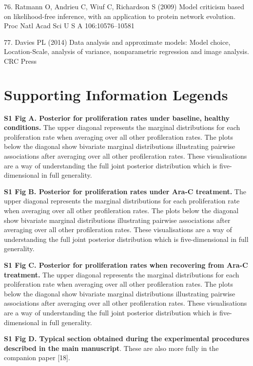 \documentclass[10pt,letterpaper]{article}
\begin{document}
\hypertarget{ref-Ratmann2009-de}{}
76. Ratmann O, Andrieu C, Wiuf C, Richardson S (2009) Model criticism
based on likelihood-free inference, with an application to protein
network evolution. Proc Natl Acad Sci U S A 106:10576--10581

\hypertarget{ref-Davies2014-dz}{}
77. Davies PL (2014) Data analysis and approximate models: Model choice,
Location-Scale, analysis of variance, nonparametric regression and image
analysis. CRC Press

\section{Supporting Information Legends}


\textbf{S1 Fig A. Posterior for proliferation rates under baseline, healthy conditions.} The upper diagonal represents the marginal distributions for each proliferation rate when averaging over all other profileration rates. The plots below the diagonal show bivariate marginal distributions illustrating pairwise associations after averaging over all other profileration rates. These visualisations are a way of understanding the full joint posterior distribution which is five-dimensional in full generality.

\textbf{S1 Fig B. Posterior for proliferation rates under Ara-C treatment.} The upper diagonal represents the marginal distributions for each proliferation rate when averaging over all other profileration rates. The plots below the diagonal show bivariate marginal distributions illustrating pairwise associations after averaging over all other profileration rates. These visualisations are a way of understanding the full joint posterior distribution which is five-dimensional in full generality.

\textbf{S1 Fig C. Posterior for proliferation rates when recovering from Ara-C treatment.} The upper diagonal represents the marginal distributions for each proliferation rate when averaging over all other profileration rates. The plots below the diagonal show bivariate marginal distributions illustrating pairwise associations after averaging over all other profileration rates. These visualisations are a way of understanding the full joint posterior distribution which is five-dimensional in full generality.

\textbf{S1 Fig D. Typical section obtained during the experimental procedures described in the main manuscript}. These are also more fully in the companion paper {[}18{]}.
\end{document}
